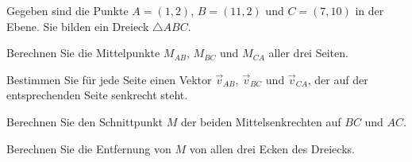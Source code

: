 Gegeben sind die Punkte $A=(1,2)$, $B=(11,2)$ und $C=(7,10)$
in der Ebene.
Sie bilden ein Dreieck $\triangle ABC$.
\begin{teilaufgaben}
\item Berechnen Sie die Mittelpunkte $M_{AB}$, $M_{BC}$ und $M_{CA}$ aller drei
Seiten.
\item Bestimmen Sie für jede Seite einen Vektor $\vec{v}_{AB}$, $\vec{v}_{BC}$
und $\vec{v}_{CA}$, der auf der entsprechenden Seite senkrecht steht.
\item Berechnen Sie den Schnittpunkt $M$ der beiden Mittelsenkrechten auf
$BC$ und $AC$.
\item Berechnen Sie die Entfernung von $M$ von allen drei Ecken des Dreiecks.
\end{teilaufgaben}


